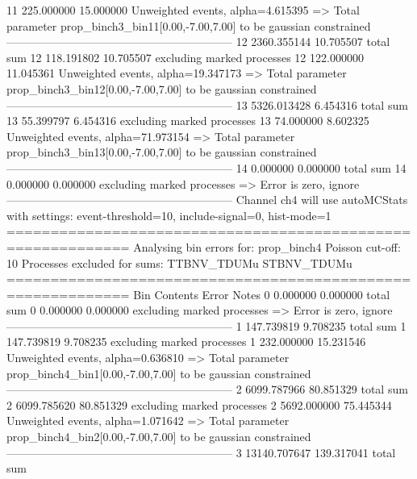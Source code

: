 11         225.000000      15.000000       Unweighted events, alpha=4.615395
  => Total parameter prop_binch3_bin11[0.00,-7.00,7.00] to be gaussian constrained
------------------------------------------------------------
12         2360.355144     10.705507       total sum                     
12         118.191802      10.705507       excluding marked processes    
12         122.000000      11.045361       Unweighted events, alpha=19.347173
  => Total parameter prop_binch3_bin12[0.00,-7.00,7.00] to be gaussian constrained
------------------------------------------------------------
13         5326.013428     6.454316        total sum                     
13         55.399797       6.454316        excluding marked processes    
13         74.000000       8.602325        Unweighted events, alpha=71.973154
  => Total parameter prop_binch3_bin13[0.00,-7.00,7.00] to be gaussian constrained
------------------------------------------------------------
14         0.000000        0.000000        total sum                     
14         0.000000        0.000000        excluding marked processes    
  => Error is zero, ignore      
------------------------------------------------------------
Channel ch4 will use autoMCStats with settings: event-threshold=10, include-signal=0, hist-mode=1
============================================================
Analysing bin errors for: prop_binch4
Poisson cut-off: 10
Processes excluded for sums: TTBNV_TDUMu STBNV_TDUMu
============================================================
Bin        Contents        Error           Notes                         
0          0.000000        0.000000        total sum                     
0          0.000000        0.000000        excluding marked processes    
  => Error is zero, ignore      
------------------------------------------------------------
1          147.739819      9.708235        total sum                     
1          147.739819      9.708235        excluding marked processes    
1          232.000000      15.231546       Unweighted events, alpha=0.636810
  => Total parameter prop_binch4_bin1[0.00,-7.00,7.00] to be gaussian constrained
------------------------------------------------------------
2          6099.787966     80.851329       total sum                     
2          6099.785620     80.851329       excluding marked processes    
2          5692.000000     75.445344       Unweighted events, alpha=1.071642
  => Total parameter prop_binch4_bin2[0.00,-7.00,7.00] to be gaussian constrained
------------------------------------------------------------
3          13140.707647    139.317041      total sum                     
